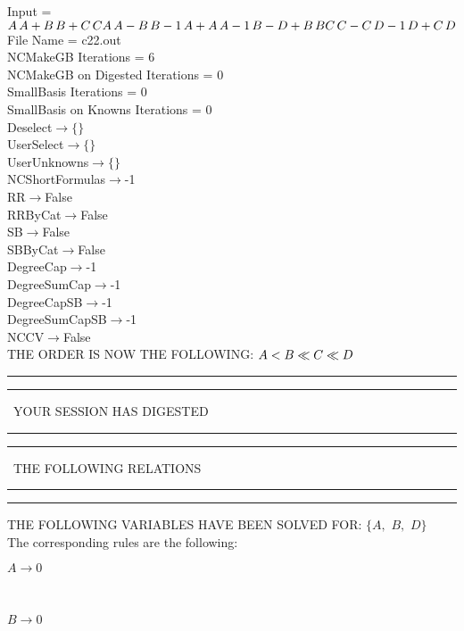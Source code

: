 \documentclass[rep10,leqno]{report}
\begin{document}
\normalsize
\baselineskip=12pt
\noindent
Input = 
$
\\A\,
 A + B\,
 B + C\,
 C\\
A\,
 A - B\,
 B\\
-1\,
 A + A\,
 A\\
-1\,
 B - D + B\,
 B\\
C\,
 C - C\,
 D\\
-1\,
 D + C\,
 D\\
$
File Name = c22.out\\
NCMakeGB Iterations = 6\\
NCMakeGB on Digested Iterations = 0\\
SmallBasis Iterations = 0\\
SmallBasis on Knowns Iterations = 0\\
Deselect$\rightarrow \{\}$\\
UserSelect$\rightarrow \{\}$\\
UserUnknowns$\rightarrow \{\}$\\
NCShortFormulas$\rightarrow$-1\\
RR$\rightarrow $False\\
RRByCat$\rightarrow $False\\
SB$\rightarrow $False\\
SBByCat$\rightarrow $False\\
DegreeCap$\rightarrow $-1\\
DegreeSumCap$\rightarrow $-1\\
DegreeCapSB$\rightarrow $-1\\
DegreeSumCapSB$\rightarrow $-1\\
NCCV$\rightarrow $False\\
THE ORDER IS NOW THE FOLLOWING:\hfil\break
$
A<B\ll
C\ll
D\\
$
\rule[2pt]{6in}{4pt}\hfil\break
\rule[2pt]{1.879in}{4pt}
\ YOUR SESSION HAS DIGESTED\ 
\rule[2pt]{1.879in}{4pt}\hfil\break
\rule[2pt]{1.923in}{4pt}
\ THE FOLLOWING RELATIONS\ 
\rule[2pt]{1.923in}{4pt}\hfil\break
\rule[2pt]{6in}{4pt}\hfil\break
THE FOLLOWING VARIABLES HAVE BEEN SOLVED FOR:\hfil\break
$\{A,
$ $
B,
$ $
D\}$
\smallskip\\
The corresponding rules are the following:\smallskip\\
\begin{minipage}{6in}
$
A\rightarrow 0
$
\end{minipage}\medskip\\
\begin{minipage}{6in}
$
B\rightarrow 0
$
\end{minipage}\medskip\\
\end{document}
